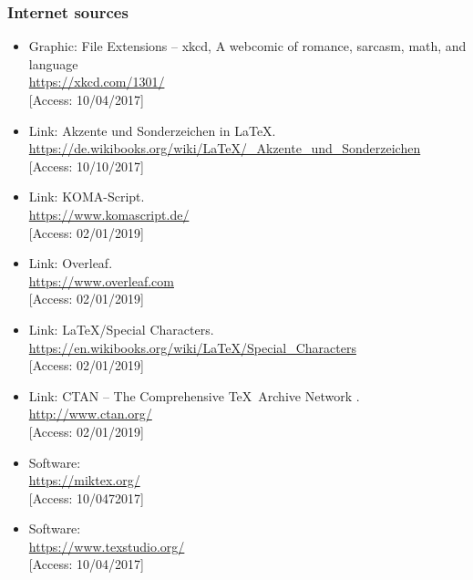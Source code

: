 \documentclass[a4paper,10pt,handout]{beamer}
\begin{document}
\begin{frame}[allowframebreaks]
\frametitle{Internet sources}

{\footnotesize
	
\begin{itemize}


		\item Graphic: File Extensions -- xkcd, A webcomic of romance, sarcasm, math, and language\\
		\url{https://xkcd.com/1301/} \\
		{[}Access: 10/04/2017]
		
		\item Link: Akzente und Sonderzeichen in \LaTeX .\\
		\url{https://de.wikibooks.org/wiki/LaTeX/_Akzente_und_Sonderzeichen}\\
		{[}Access: 10/10/2017]
		
		\item Link: KOMA-Script.\\
		\url{https://www.komascript.de/}\\
		{[}Access: 02/01/2019]
		
		\item Link: Overleaf.\\
		\url{https://www.overleaf.com}\\
		{[}Access: 02/01/2019]
		
		\item Link: \LaTeX /Special Characters.\\
		\url{https://en.wikibooks.org/wiki/LaTeX/Special_Characters}\\
		{[}Access: 02/01/2019]
		
		\item Link: CTAN -- The Comprehensive \TeX\ Archive Network .\\
		\url{http://www.ctan.org/}\\
		{[}Access: 02/01/2019]
		
		\item Software: \\
		\url{https://miktex.org/} \\
		{[}Access: 10/0472017]
		
		\item Software: \\
		\url{https://www.texstudio.org/} \\
		{[}Access: 10/04/2017]



\end{itemize}}
\end{frame}
\end{document}
